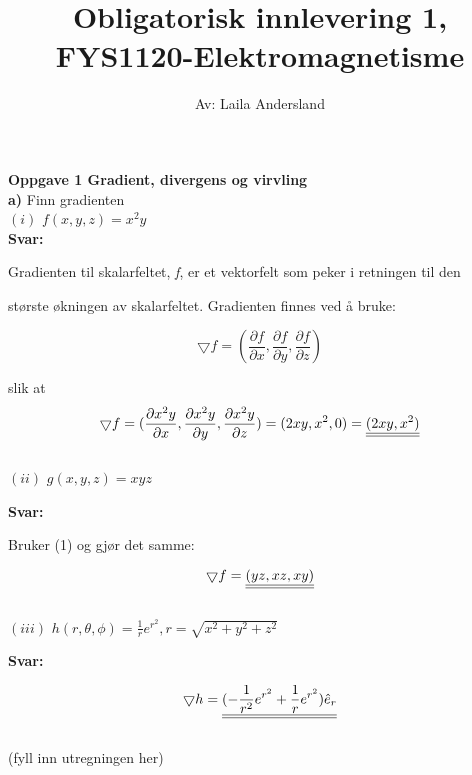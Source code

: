 \documentclass[a4paper,norsk,12pt]{article}
\title{\textbf{Obligatorisk innlevering 1, FYS1120-Elektromagnetisme}}
\author{Av: Laila Andersland}
\begin{document}
\maketitle

\textbf{Oppgave 1 \hspace{3mm}  Gradient, divergens og virvling} \\

\textbf{a)} \hspace{3mm}  { Finn gradienten} \\

$(i)$ \hspace{3mm} $f(x,y,z) = x^{2} y$ \\

\textbf{Svar:}

{Gradienten til skalarfeltet, \textit{f}, er et vektorfelt som peker i retningen til den} 

{største økningen av skalarfeltet. Gradienten finnes ved å bruke:}

\begin{equation}
\bigtriangledown f = ( \frac{\partial f}{\partial x} , \frac{\partial f}{\partial y} , \frac{\partial f}{\partial z} )
\end{equation}

slik at
$$
\bigtriangledown f = ( \frac{\partial x^{2}y}{\partial x} , \frac{\partial x^2 y}{\partial y} , \frac{\partial x^2 y}{\partial z} ) 
=
\def\doubleunderline#1{\underline{\underline{#1}}}
 (2xy , x^2 , 0) = \doubleunderline{(2xy,x^2)}
$$\\

$(ii)$ \hspace{3mm} $g(x,y,z) = x y z $ \

\textbf{Svar:}

Bruker (1) og gjør det samme:

$$
\def\doubleunderline#1{\underline{\underline{#1}}}
\bigtriangledown f  = \doubleunderline{(yz, xz, xy)}
$$ \\


$(iii)$ \hspace{3mm} $h(r,\theta ,\phi) = \frac{1}{r} e^{r^2} , r = \sqrt{x^2 + y^2 + z^2} $ \

\textbf{Svar:}

$$
\def\doubleunderline#1{\underline{\underline{#1}}}
\bigtriangledown h  = \doubleunderline{(- \frac{1}{r^2} e^{r^2} + \frac{1}{r} e^{r^2} ) \hat{e}_r}
$$ \\



(fyll inn utregningen her)\\
\end{document}
